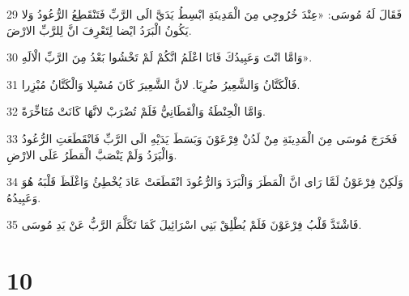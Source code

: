 \par 29 فَقَالَ لَهُ مُوسَى: «عِنْدَ خُرُوجِي مِنَ الْمَدِينَةِ ابْسِطُ يَدَيَّ الَى الرَّبِّ فَتَنْقَطِعُ الرُّعُودُ وَلا يَكُونُ الْبَرَدُ ايْضا لِتَعْرِفَ انَّ لِلرَّبِّ الارْضَ.
\par 30 وَامَّا انْتَ وَعَبِيدُكَ فَانَا اعْلَمُ انَّكُمْ لَمْ تَخْشُوا بَعْدُ مِنَ الرَّبِّ الْالَهِ».
\par 31 فَالْكَتَّانُ وَالشَّعِيرُ ضُرِبَا. لانَّ الشَّعِيرَ كَانَ مُسْبِلا وَالْكَتَّانُ مُبْزِرا.
\par 32 وَامَّا الْحِنْطَةُ وَالْقَطَانِيُّ فَلَمْ تُضْرَبْ لانَّهَا كَانَتْ مُتَاخِّرَةً.
\par 33 فَخَرَجَ مُوسَى مِنَ الْمَدِينَةِ مِنْ لَدُنْ فِرْعَوْنَ وَبَسَطَ يَدَيْهِ الَى الرَّبِّ فَانْقَطَعَتِ الرُّعُودُ وَالْبَرَدُ وَلَمْ يَنْصَبَّ الْمَطَرُ عَلَى الارْضِ.
\par 34 وَلَكِنْ فِرْعَوْنُ لَمَّا رَاى انَّ الْمَطَرَ وَالْبَرَدَ وَالرُّعُودَ انْقَطَعَتْ عَادَ يُخْطِئُ وَاغْلَظَ قَلْبَهُ هُوَ وَعَبِيدُهُ.
\par 35 فَاشْتَدَّ قَلْبُ فِرْعَوْنَ فَلَمْ يُطْلِقْ بَنِي اسْرَائِيلَ كَمَا تَكَلَّمَ الرَّبُّ عَنْ يَدِ مُوسَى.

\chapter{10}

